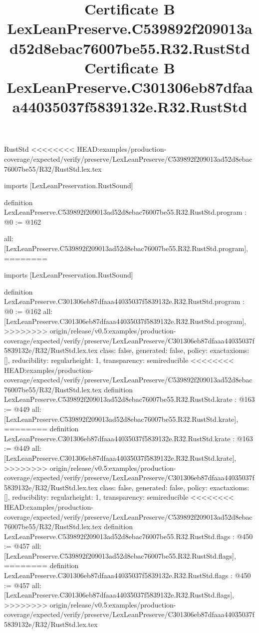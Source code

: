 \begin{lexlean}{RustStd}
<<<<<<<< HEAD:examples/production-coverage/expected/verify/preserve/LexLeanPreserve/C539892f209013ad52d8ebac76007be55/R32/RustStd.lex.tex
\title{Certificate B LexLeanPreserve.C539892f209013ad52d8ebac76007be55.R32.RustStd}
\begin{coremodule}
imports [LexLeanPreservation.RustSound]

definition LexLeanPreserve.C539892f209013ad52d8ebac76007be55.R32.RustStd.program : @0 := @162 {
  all: [LexLeanPreserve.C539892f209013ad52d8ebac76007be55.R32.RustStd.program],
========
\title{Certificate B LexLeanPreserve.C301306eb87dfaaa44035037f5839132e.R32.RustStd}
\begin{coremodule}
imports [LexLeanPreservation.RustSound]

definition LexLeanPreserve.C301306eb87dfaaa44035037f5839132e.R32.RustStd.program : @0 := @162 {
  all: [LexLeanPreserve.C301306eb87dfaaa44035037f5839132e.R32.RustStd.program],
>>>>>>>> origin/release/v0.5:examples/production-coverage/expected/verify/preserve/LexLeanPreserve/C301306eb87dfaaa44035037f5839132e/R32/RustStd.lex.tex
  class: false,
  generated: false,
  policy: exact{axioms: []},
  reducibility: regular{height: 1},
  transparency: semireducible
}
<<<<<<<< HEAD:examples/production-coverage/expected/verify/preserve/LexLeanPreserve/C539892f209013ad52d8ebac76007be55/R32/RustStd.lex.tex
definition LexLeanPreserve.C539892f209013ad52d8ebac76007be55.R32.RustStd.krate : @163 := @449 {
  all: [LexLeanPreserve.C539892f209013ad52d8ebac76007be55.R32.RustStd.krate],
========
definition LexLeanPreserve.C301306eb87dfaaa44035037f5839132e.R32.RustStd.krate : @163 := @449 {
  all: [LexLeanPreserve.C301306eb87dfaaa44035037f5839132e.R32.RustStd.krate],
>>>>>>>> origin/release/v0.5:examples/production-coverage/expected/verify/preserve/LexLeanPreserve/C301306eb87dfaaa44035037f5839132e/R32/RustStd.lex.tex
  class: false,
  generated: false,
  policy: exact{axioms: []},
  reducibility: regular{height: 1},
  transparency: semireducible
}
<<<<<<<< HEAD:examples/production-coverage/expected/verify/preserve/LexLeanPreserve/C539892f209013ad52d8ebac76007be55/R32/RustStd.lex.tex
definition LexLeanPreserve.C539892f209013ad52d8ebac76007be55.R32.RustStd.flags : @450 := @457 {
  all: [LexLeanPreserve.C539892f209013ad52d8ebac76007be55.R32.RustStd.flags],
========
definition LexLeanPreserve.C301306eb87dfaaa44035037f5839132e.R32.RustStd.flags : @450 := @457 {
  all: [LexLeanPreserve.C301306eb87dfaaa44035037f5839132e.R32.RustStd.flags],
>>>>>>>> origin/release/v0.5:examples/production-coverage/expected/verify/preserve/LexLeanPreserve/C301306eb87dfaaa44035037f5839132e/R32/RustStd.lex.tex
}}}
\end{coremodule}}
\end{coremodule}
\end{lexlean}

